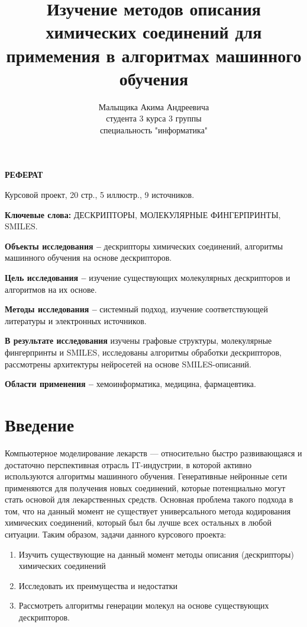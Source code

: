 \documentclass[a4paper,14pt]{extreport}
\title{Изучение методов описания химических соединений для примемения в алгоритмах машинного обучения}
\author{Малыщика Акима Андреевича\\
студента 3 курса 3 группы\\
специальность "информатика"}
\begin{document}
\maketitle
\setcounter{page}{2}
\begin{center}
  \large\bfseries{РЕФЕРАТ}
\end{center}

Курсовой проект, 20 стр., 5 иллюстр., 9 источников.

\textbf{Ключевые слова:} ДЕСКРИПТОРЫ, МОЛЕКУЛЯРНЫЕ ФИНГЕРПРИНТЫ, SMILES.

\textbf{Объекты исследования --} дескрипторы химических соединений, алгоритмы машинного обучения на основе дескрипторов.

\textbf{Цель исследования --} изучение существующих молекулярных дескрипторов и алгоритмов на их основе.

\textbf{Методы исследования --} системный подход, изучение соответствующей литературы и электронных источников.

\textbf{В результате исследования} изучены графовые структуры, молекулярные фингерпринты и SMILES, исследованы алгоритмы обработки дескрипторов, рассмотрены архитектуры нейросетей на основе SMILES-описаний.

\textbf{Области применения --} хемоинформатика, медицина, фармацевтика.

\newpage
  {
    \renewcommand{\contentsname}{Содержание}
    
    \tableofcontents
  }

  \chapter*{Введение}
  \label{c:introduction}

Компьютерное моделирование лекарств — относительно быстро развивающаяся и достаточно перспективная отрасль IT-индустрии, в которой активно используются алгоритмы машинного обучения. Генеративные нейронные сети применяются для получения новых соединений, которые потенциально могут стать основой для лекарственных средств. Основная проблема такого подхода в том, что на данный момент не существует универсального метода кодирования химических соединений, который был бы лучше всех остальных в любой ситуации. Таким образом, задачи данного курсового проекта:

\begin{enumerate}
\item Изучить существующие на данный момент методы описания (дескрипторы) химических соединений
\item Исследовать их преимущества и недостатки
\item Рассмотреть алгоритмы генерации молекул на основе существующих дескрипторов.
\end{enumerate}
\end{document}
